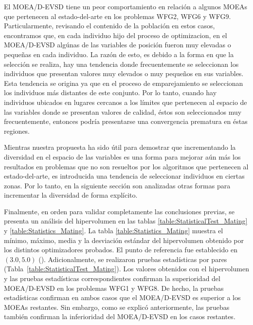 El MOEA/D-EVSD tiene un peor comportamiento en relación a algunos MOEAs que pertenecen al estado-del-arte en los problemas WFG2, WFG6 y WFG9.
%
Particularmente, revisando el contenido de la población en estos casos, encontramos que, en cada individuo hijo del proceso de optimizacion, en el MOEA/D-EVSD algúnas de las variables de posición fueron muy elevadas o pequeñas en cada individuo.
%
La razón de esto, es debido a la forma en que la selección se realiza, hay una tendencia donde frecuentemente se seleccionan los individuos que presentan valores muy elevados o muy pequeños en sus variables.
%
Esta tendencia se origina ya que en el proceso de emparejamiento se seleccionan los individuos más distantes de este conjunto.
%
Por lo tanto, cuando hay individuos ubicados en lugares cercanos a los límites que pertenecen al espacio de las variables donde se presentan valores de calidad, éstos son seleccionados muy frecuentemente, entonces podría presentarse una convergencia prematura en éstas regiones.

%
Mientras nuestra propuesta ha sido útil para demostrar que incrementando la diversidad en el espacio de las variables es una forma para mejorar aún más los resultados en problemas que no son resueltos por los algoritmos que pertenecen al estado-del-arte, es introducida una tendencia de seleccionar individuos en ciertas zonas.
%
Por lo tanto, en la siguiente sección son analizadas otras formas para incrementar la diversidad de forma explícito.
%

Finalmente, en orden para validar completamente las conclusiones previas, se presenta un análisis del hipervolumen en las tablas \ref{table:StatisticalTest_Mating} y \ref{table:Statistics_Mating}.
%
La tabla \ref{table:Statistics_Mating} muestra el mínimo, máximo, media y la desviación estándar del hipervolumen obtenido por los distintos optimizadores probados.
%
El punto de referencia fue establecido en $(3.0, 5.0)$ (\cite{Joel:OperatorAHX}). 
%
Adicionalmente, se realizaron pruebas estadísticas por pares (Tabla~\ref{table:StatisticalTest_Mating}).
%
%
Los valores obtenidos con el hipervolumen y las pruebas estadísticas correspondientes confirman la superioridad del MOEA/D-EVSD en los problemas WFG1 y WFG8.
%
De hecho, la pruebas estadísticas confirman en ambos casos que el MOEA/D-EVSD es superior a los MOEAs restantes.
%
Sin embargo, como se explicó anteriormente, las pruebas también confirman la inferioridad del MOEA/D-EVSD en los casos restantes.
  
